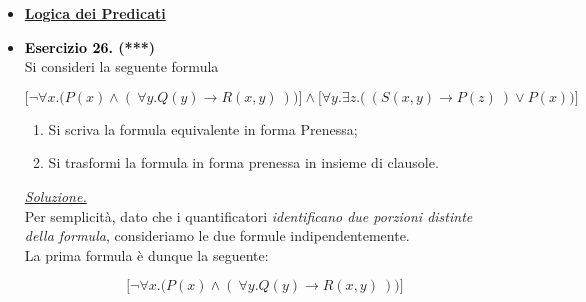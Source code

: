 \documentclass[a4paper,10pt]{article}
\begin{document}
    {\normalsize
    \begin{itemize}[label=, leftmargin=0pt]
    

    
    

    \item \textbf{\underline{Logica dei Predicati}}
    \item \textbf{\textcolor{black}{Esercizio 26.} (***)} \\ 	
    Si consideri la seguente formula 

    $$\bigg[ \lnot \forall x.\bigg( P(x)\land (\ \forall y. Q(y)\rightarrow R(x,y)\ )\bigg)\bigg]\land \bigg[\forall y.\exists z.\bigg(\ (S(x,y)\rightarrow P(z)\ )\lor P(x)\bigg)\bigg]$$
    \begin{enumerate}
        \item Si scriva la formula equivalente in forma Prenessa;
        \item Si trasformi la formula in forma prenessa in insieme di clausole.
    \end{enumerate}

    \begin{osservazioni}
    \underline{\textit{Soluzione.}}\\
    Per semplicità, dato che i quantificatori \textit{identificano due porzioni distinte della formula}, consideriamo le due formule indipendentemente.\\

    La prima formula è dunque la seguente:
    
    $$\bigg[ \lnot \forall x.\bigg( P(x)\land (\ \forall y. Q(y)\rightarrow R(x,y)\ )\bigg)\bigg]$$


\end{osservazioni}
\end{itemize}}
\end{document}

